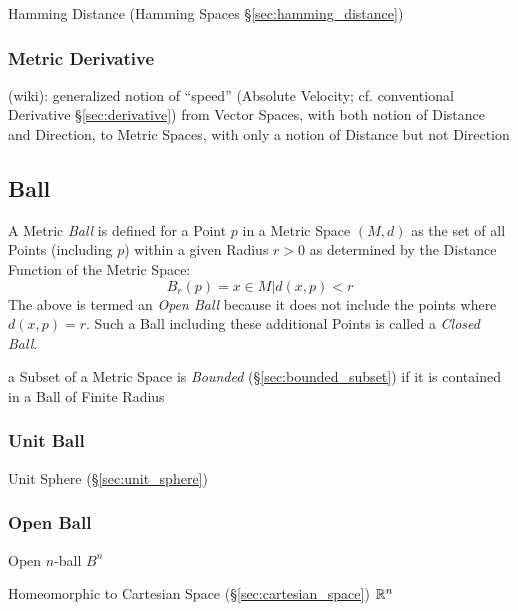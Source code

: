 \fist Hamming Distance (Hamming Spaces \S\ref{sec:hamming_distance})



\subsubsection{Metric Derivative}\label{sec:metric_derivative}

(wiki): generalized notion of ``speed'' (Absolute Velocity; cf. conventional
Derivative \S\ref{sec:derivative}) from Vector Spaces, with both notion of
Distance and Direction, to Metric Spaces, with only a notion of Distance but not
Direction



\subsection{Ball}\label{sec:ball}

A Metric \emph{Ball} is defined for a Point $p$ in a Metric Space
$(M,d)$ as the set of all Points (including $p$) within a given Radius
$r > 0$ as determined by the Distance Function of the Metric Space:
\[
  B_r(p) = {x \in M | d(x,p) < r }
\]
The above is termed an \emph{Open Ball} because it does not include
the points where $d(x,p) = r$. Such a Ball including these additional
Points is called a \emph{Closed Ball}.

a Subset of a Metric Space is \emph{Bounded} (\S\ref{sec:bounded_subset}) if it
is contained in a Ball of Finite Radius



\subsubsection{Unit Ball}\label{sec:unit_ball}

Unit Sphere (\S\ref{sec:unit_sphere})



\subsubsection{Open Ball}\label{sec:open_ball}

Open $n$-ball $B^n$

Homeomorphic to Cartesian Space (\S\ref{sec:cartesian_space})
$\mathbb{R}^n$



